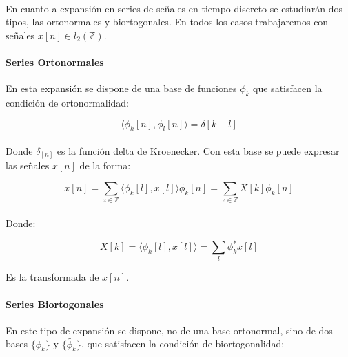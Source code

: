 \paragraph{}
En cuanto a expansión en series de señales en tiempo discreto se estudiarán dos tipos, las ortonormales y biortogonales. En todos los casos trabajaremos con señales $x[n] \in l_{2}(\mathbb{Z})$.


\paragraph{Series Ortonormales}
En esta expansión se dispone de una base de funciones $\phi_k$ que satisfacen la condición de ortonormalidad:

\begin{equation}
	\langle \phi_k[n] , \phi_l[n] \rangle = \delta[k - l]
\end{equation}

\paragraph{}
Donde $\delta_[n]$ es la función delta de Kroenecker. Con esta base se puede expresar las señales $x[n]$ de la forma:

\begin{equation}
	x[n] = \sum_{z \in \mathbb{Z}} \langle \phi_k[l] , x[l] \rangle \phi_{k}[n] = \sum_{z \in \mathbb{Z}} X[k] \phi_{k}[n]
\end{equation}

\paragraph{}
Donde:

\begin{equation}
	X[k] = \langle \phi_k[l] , x[l] \rangle = \sum_{l} \phi_{k}^{*} x[l]
\end{equation}

Es la transformada de $x[n]$.


\paragraph{Series Biortogonales}
En este tipo de expansión se dispone, no de una base ortonormal, sino de dos bases $\{ \phi_{k} \}$ y $\{ \tilde{\phi_{k}} \}$, que satisfacen la condición de biortogonalidad:

